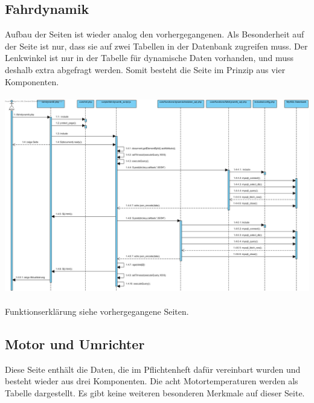 \documentclass[fontsize = 12pt, paper = a4]{scrreprt}
\begin{document}
\subsection{Fahrdynamik}
Aufbau der Seiten ist wieder analog den vorhergegangenen. Als Besonderheit auf der Seite ist nur, dass sie auf zwei Tabellen in der Datenbank zugreifen muss. Der Lenkwinkel ist nur in der Tabelle für dynamische Daten vorhanden, und muss deshalb extra abgefragt werden. Somit besteht die Seite im Prinzip aus vier Komponenten.\\ \\


\includegraphics[scale=0.42]{fahrdynamik.png}
\\ \\
Funktionserklärung siehe vorhergegangene Seiten.\\

\newpage

\subsection{Motor und Umrichter}

Diese Seite enthält die Daten, die im Pflichtenheft dafür vereinbart wurden und besteht wieder aus drei Komponenten. Die acht Motortemperaturen werden als Tabelle dargestellt. Es gibt keine weiteren besonderen Merkmale auf dieser Seite.\\ \\
\end{document}
